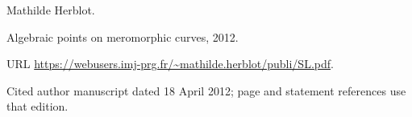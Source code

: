 Mathilde Herblot.

\newblock Algebraic points on meromorphic curves, 2012.

\newblock URL \url{https://webusers.imj-prg.fr/~mathilde.herblot/publi/SL.pdf}.

\newblock Cited author manuscript dated 18 April 2012; page and statement references use that edition.
